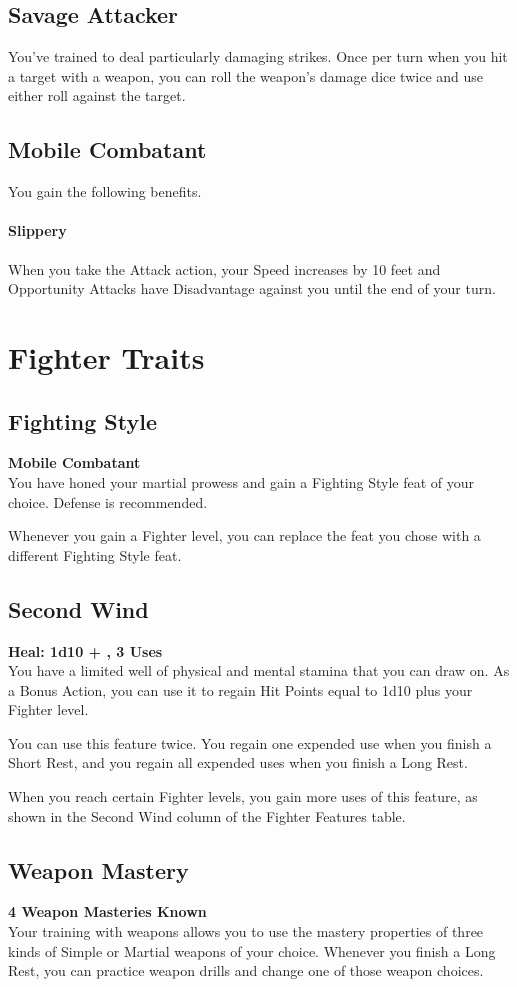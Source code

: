 \documentclass[letterpaper,openany,oneside,twocolumn]{book}
\begin{document}
\subsection*{Savage Attacker}
You've trained to deal particularly damaging strikes. Once per turn when you hit a target with a weapon, you can roll the weapon's damage dice twice and use either roll against the target.
\subsection*{Mobile Combatant}
You gain the following benefits.

\paragraph*{Slippery} When you take the Attack action, your Speed increases by 10 feet and Opportunity Attacks have Disadvantage against you until the end of your turn.

\section*{Fighter Traits}
\subsection*{Fighting Style}
\textbf{Mobile Combatant}\\
You have honed your martial prowess and gain a Fighting Style feat of your choice. Defense is recommended.

Whenever you gain a Fighter level, you can replace the feat you chose with a different Fighting Style feat.
\subsection*{Second Wind}
\textbf{Heal: 1d10 + , 3 Uses}\\
You have a limited well of physical and mental stamina that you can draw on. As a Bonus Action, you can use it to regain Hit Points equal to 1d10 plus your Fighter level.

You can use this feature twice. You regain one expended use when you finish a Short Rest, and you regain all expended uses when you finish a Long Rest.

When you reach certain Fighter levels, you gain more uses of this feature, as shown in the Second Wind column of the Fighter Features table.
\subsection*{Weapon Mastery}
\textbf{4 Weapon Masteries Known}\\
Your training with weapons allows you to use the mastery properties of three kinds of Simple or Martial weapons of your choice. Whenever you finish a Long Rest, you can practice weapon drills and change one of those weapon choices.
\end{document}
